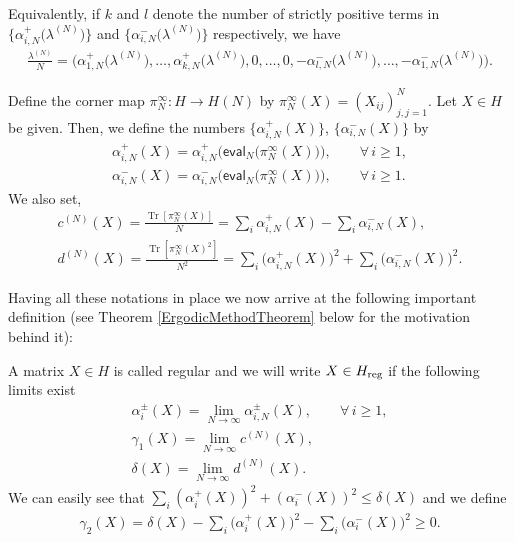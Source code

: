 Equivalently, if $k$ and $l$ denote the number of strictly positive terms in $\big\{\alpha_{i,N}^+\big(\lambda^{(N)}\big) \big\}$ and $ \big\{\alpha_{i,N}^-\big(\lambda^{(N)}\big) \big\}$ respectively, we have
\begin{gather*}
\frac{\lambda^{(N)}}{N}=\big(\alpha_{1,N}^+\big(\lambda^{(N)}\big),\dots,\alpha_{k,N}^+\big(\lambda^{(N)}\big),0, \dots, 0, -\alpha_{l,N}^-\big(\lambda^{(N)}\big),\dots,-\alpha_{1,N}^-\big(\lambda^{(N)}\big)\big).
\end{gather*}

 Define the corner map $\pi_N^{\infty}\colon H \to H(N)$ by $\pi_N^{\infty}(X)=(X_{ij})^N_{j,j=1}$. Let $X\in H$ be given. Then, we define the numbers $\big\{\alpha_{i,N}^+(X) \big\}$, $\big\{\alpha_{i,N}^-(X) \big\}$ by
\begin{gather*}
\alpha_{i,N}^+(X)=\alpha_{i,N}^+\big(\mathsf{eval}_N\big(\pi_N^{\infty}(X)\big)\big), \qquad \forall\, i \ge 1,\\
\alpha_{i,N}^-(X)=\alpha_{i,N}^-\big(\mathsf{eval}_N\big(\pi_N^{\infty}(X)\big)\big), \qquad \forall\, i \ge 1.
\end{gather*}
We also set,
\begin{gather*}
c^{(N)}(X) =\frac{\operatorname{Tr}[\pi_N^{\infty}(X)]}{N}=\sum_{i}^{}\alpha_{i,N}^+(X) -\sum_{i}^{}\alpha_{i,N}^-(X),\\
d^{(N)}(X) =\frac{\operatorname{Tr}[\pi_N^{\infty}(X)^2]}{N^2}=\sum_{i}^{}\big(\alpha_{i,N}^+(X)\big)^2+\sum_{i}^{}\big(\alpha_{i,N}^-(X)\big)^2 .
\end{gather*}

Having all these notations in place we now arrive at the following important definition (see Theorem \ref{ErgodicMethodTheorem} below for the motivation behind it):

\begin{Definition}A matrix $X \in H$ is called regular and we will write $X \in H_{{\rm reg}}$ if the following limits exist
\begin{gather*}
\alpha_i^{\pm}(X) =\lim_{N \to \infty}\alpha_{i,N}^{\pm}(X), \qquad \forall\, i \ge 1,\\
\gamma_1(X) =\lim_{N \to \infty}c^{(N)}(X),\\
\delta(X) =\lim_{N \to \infty}d^{(N)}(X).
\end{gather*}
We can easily see that $\sum_{i}^{} (\alpha_{i}^+(X) )^2+ (\alpha_{i}^-(X) )^2 \le \delta(X)$ and we define
\begin{gather*}
\gamma_2(X)=\delta(X)-\sum_{i}^{}\big(\alpha_{i}^+(X)\big)^2-\sum_{i}^{}\big(\alpha_{i}^-(X)\big)^2\ge 0.
\end{gather*}
\end{Definition}

